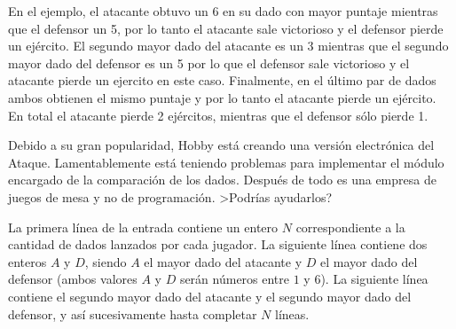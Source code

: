 \documentclass{oci}
\newcommand{\gana}{} %
\newcommand{\pierde}{$\times$}
\begin{document}
\begin{problemDescription}
\begin{center}
  \end{center}
 
  En el ejemplo, el atacante obtuvo un 6 en su dado con mayor puntaje
  mientras que el defensor un 5, por lo tanto el atacante sale victorioso y el
  defensor pierde un ejército.
  El segundo mayor dado del atacante es un 3 mientras que el segundo mayor dado del defensor
  es un 5 por lo que el
  defensor sale victorioso y el atacante pierde un ejercito en este caso.
  Finalmente, en el último par de dados ambos obtienen el mismo puntaje y por lo tanto
  el atacante pierde un ejército.
  En total el atacante pierde 2 ejércitos, mientras que el defensor sólo
  pierde 1.

  Debido a su gran popularidad, Hobby está creando una versión electrónica
  del Ataque.
  Lamentablemente está teniendo problemas para implementar el módulo encargado
  de la comparación de los dados.
  Después de todo es una empresa de juegos de mesa y no de programación.
  >Podrías ayudarlos?
\newpage
\end{problemDescription}

\begin{inputDescription}
  La primera línea de la entrada contiene un entero $N$ correspondiente a la cantidad de
  dados lanzados por cada jugador.
  La siguiente línea contiene dos enteros $A$ y $D$,
  siendo $A$ el mayor dado del atacante y $D$ el mayor dado del defensor (ambos valores
  $A$ y $D$ serán números entre $1$ y $6$).
  La siguiente línea contiene el segundo mayor dado del atacante y el segundo mayor
  dado del defensor, y así sucesivamente hasta completar $N$ líneas.  
\end{inputDescription}
\end{document}
